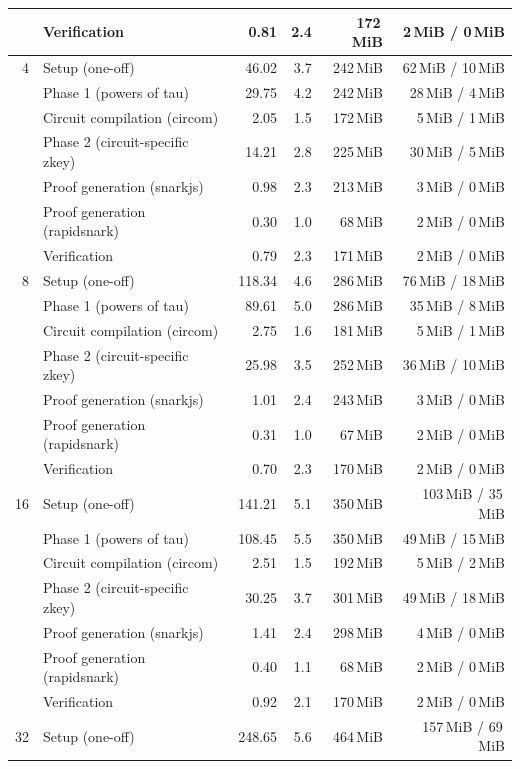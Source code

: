 \begin{table}[t]
{\begin{tabular}{|r|l|r|r|r|r|}
 & Verification & 0.81 & 2.4 & 172\,MiB & 2\,MiB / 0\,MiB \\
\hline
4 & Setup (one-off) & 46.02 & 3.7 & 242\,MiB & 62\,MiB / 10\,MiB \\
 & \quad Phase 1 (powers of tau) & 29.75 & 4.2 & 242\,MiB & 28\,MiB / 4\,MiB \\
 & \quad Circuit compilation (circom) & 2.05 & 1.5 & 172\,MiB & 5\,MiB / 1\,MiB \\
 & \quad Phase 2 (circuit-specific zkey) & 14.21 & 2.8 & 225\,MiB & 30\,MiB / 5\,MiB \\
 & Proof generation (snarkjs) & 0.98 & 2.3 & 213\,MiB & 3\,MiB / 0\,MiB \\
 & Proof generation (rapidsnark) & 0.30 & 1.0 & 68\,MiB & 2\,MiB / 0\,MiB \\
 & Verification & 0.79 & 2.3 & 171\,MiB & 2\,MiB / 0\,MiB \\
\hline
8 & Setup (one-off) & 118.34 & 4.6 & 286\,MiB & 76\,MiB / 18\,MiB \\
 & \quad Phase 1 (powers of tau) & 89.61 & 5.0 & 286\,MiB & 35\,MiB / 8\,MiB \\
 & \quad Circuit compilation (circom) & 2.75 & 1.6 & 181\,MiB & 5\,MiB / 1\,MiB \\
 & \quad Phase 2 (circuit-specific zkey) & 25.98 & 3.5 & 252\,MiB & 36\,MiB / 10\,MiB \\
 & Proof generation (snarkjs) & 1.01 & 2.4 & 243\,MiB & 3\,MiB / 0\,MiB \\
 & Proof generation (rapidsnark) & 0.31 & 1.0 & 67\,MiB & 2\,MiB / 0\,MiB \\
 & Verification & 0.70 & 2.3 & 170\,MiB & 2\,MiB / 0\,MiB \\
\hline
16 & Setup (one-off) & 141.21 & 5.1 & 350\,MiB & 103\,MiB / 35\,MiB \\
 & \quad Phase 1 (powers of tau) & 108.45 & 5.5 & 350\,MiB & 49\,MiB / 15\,MiB \\
 & \quad Circuit compilation (circom) & 2.51 & 1.5 & 192\,MiB & 5\,MiB / 2\,MiB \\
 & \quad Phase 2 (circuit-specific zkey) & 30.25 & 3.7 & 301\,MiB & 49\,MiB / 18\,MiB \\
 & Proof generation (snarkjs) & 1.41 & 2.4 & 298\,MiB & 4\,MiB / 0\,MiB \\
 & Proof generation (rapidsnark) & 0.40 & 1.1 & 68\,MiB & 2\,MiB / 0\,MiB \\
 & Verification & 0.92 & 2.1 & 170\,MiB & 2\,MiB / 0\,MiB \\
\hline
32 & Setup (one-off) & 248.65 & 5.6 & 464\,MiB & 157\,MiB / 69\,MiB \\

\end{tabular}}
\end{table}
